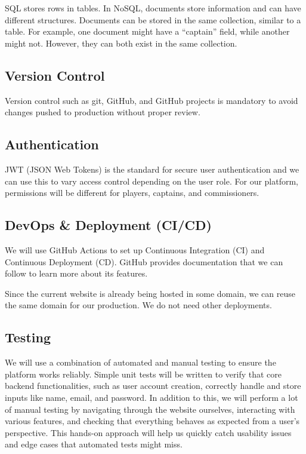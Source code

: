 \documentclass{article}
\begin{document}
SQL stores rows in tables. In NoSQL, documents store information and can have different structures. Documents can be stored in the same collection, similar to a table. For example, one document might have a ``captain'' field, while another might not. However, they can both exist in the same collection.

\subsection{Version Control}
Version control such as git, GitHub, and GitHub projects is mandatory to avoid changes pushed to production without proper review.

\subsection{Authentication}
JWT (JSON Web Tokens) is the standard for secure user authentication and we can use this to vary access control depending on the user role. For our platform, permissions will be different for players, captains, and commissioners.

\subsection{DevOps \& Deployment (CI/CD)}
We will use GitHub Actions to set up Continuous Integration (CI) and Continuous Deployment (CD). GitHub provides documentation that we can follow to learn more about its features.

Since the current website is already being hosted in some domain, we can reuse the same domain for our production. We do not need other deployments.

\subsection{Testing}
We will use a combination of automated and manual testing to ensure the platform works reliably. Simple unit tests will be written to verify that core backend functionalities, such as user account creation, correctly handle and store inputs like name, email, and password. In addition to this, we will perform a lot of manual testing by navigating through the website ourselves, interacting with various features, and checking that everything behaves as expected from a user's perspective. This hands-on approach will help us quickly catch usability issues and edge cases that automated tests might miss.
\end{document}
